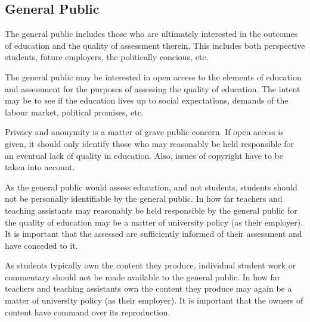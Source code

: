 \subsection{General Public}

The general public includes those who are ultimately interested in the outcomes
of education and the quality of assessment therein. This includes both
perspective students, future employers, the politically concious, etc.

The general public may be interested in open access to the elements of
education and assessment for the purposes of assessing the quality of
education. The intent may be to see if the education lives up to social
expectations, demands of the labour market, political promises, etc.

Privacy and anonymity is a matter of grave public concern. If open access is
given, it should only identify those who may reasonably be held responsible for
an eventual lack of quality in education. Also, issues of copyright have to be
taken into account.

As the general public would assess education, and not students, students should
not be personally identifiable by the general public. In how far teachers and
teaching assistants may reasonably be held responsible by the general public
for the quality of education may be a matter of university policy (as their
employer). It is important that the assessed are sufficiently informed of their
assessment and have conceded to it.

As students typically own the content they produce, individual student work or
commentary should not be made available to the general public. In how far
teachers and teaching assistants own the content they produce may again be a
matter of university policy (as their employer). It is important that the
owners of content have command over its reproduction.

